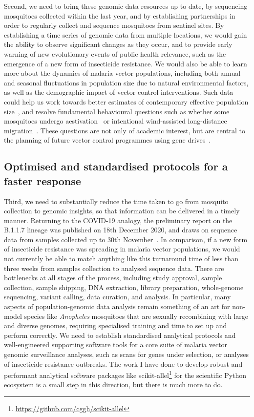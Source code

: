 \documentclass[a4paper,11pt,abstracton,hidelinks]{scrartcl}
\begin{document}
Second, we need to bring these genomic data resources up to date, by sequencing mosquitoes collected within the last year, and by establishing partnerships in order to regularly collect and sequence mosquitoes from sentinel sites.
%
By establishing a time series of genomic data from multiple locations, we would gain the ability to observe significant changes as they occur, and to provide early warning of new evolutionary events of public health relevance, such as the emergence of a new form of insecticide resistance.
%
We would also be able to learn more about the dynamics of malaria vector populations, including both annual and seasonal fluctuations in population size due to natural environmental factors, as well as the demographic impact of vector control interventions.
%
Such data could help us work towards better estimates of contemporary effective population size~\parencite{Hui2015}, and resolve fundamental behavioural questions such as whether some mosquitoes undergo aestivation~\parencite{Dao2014} or intentional wind-assisted long-distance migration~\parencite{Huestis2019}.
%
These questions are not only of academic interest, but are central to the planning of future vector control programmes using gene drives~\parencite{North2019}.


\subsection{Optimised and standardised protocols for a faster response}


Third, we need to substantially reduce the time taken to go from mosquito collection to genomic insights, so that information can be delivered in a timely manner.
%
Returning to the COVID-19 analogy, the preliminary report on the B.1.1.7 lineage was published on 18th December 2020, and draws on sequence data from samples collected up to 30th November~\parencite{Rambaut2020}.
%
In comparison, if a new form of insecticide resistance was spreading in malaria vector populations, we would not currently be able to match anything like this turnaround time of less than three weeks from samples collection to analysed sequence data.
%
There are bottlenecks at all stages of the process, including study approval, sample collection, sample shipping, DNA extraction, library preparation, whole-genome sequencing, variant calling, data curation, and analysis.
%
In particular, many aspects of population-genomic data analysis remain something of an art for non-model species like \textit{Anopheles} mosquitoes that are sexually recombining with large and diverse genomes, requiring specialised training and time to set up and perform correctly.
%
We need to establish standardised analytical protocols and well-engineered supporting software tools for a core suite of malaria vector genomic surveillance analyses, such as scans for genes under selection, or analyses of insecticide resistance outbreaks.
%
The work I have done to develop robust and performant analytical software packages like scikit-allel\footnote{\url{https://github.com/cggh/scikit-allel}} for the scientific Python ecosystem is a small step in this direction, but there is much more to do.
\end{document}
